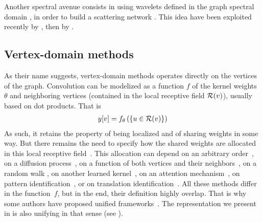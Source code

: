 Another spectral avenue consists in using wavelets defined in the graph spectral domain \citep{hammond2011wavelets}, in order to build a scattering network \citep{bruna2013invariant,chen2014unsupervised}. This idea have been exploited recently by \cite{zou2018Graph}, then by \cite{gama2018Diffusion}.

\subsection{Vertex-domain methods}
\label{sec:vert}

As their name suggests, vertex-domain methods operates directly on the vertices of the graph. %
Convolution can be modelized as a function $f$ of the kernel weights $\theta$ and neighboring vertices (contained in the local receptive field $\mathcal{R}(v)$), usually based on dot products. That is
\begin{gather}
y[v] = f_\theta\left(\{u \in \mathcal{R}(v)\}\right)
\end{gather}
As such, it retains the property of being localized and of sharing weights in some way. But there remains the need to specify how the shared weights are allocated in this local receptive field~\citep{vialatte2016generalizing}. This allocation can depend on \eg an arbitrary order~\citep{niepert2016learning}, on a diffusion process~\citep{atwood2016diffusion}, on a function of both vertices and their neighbors~\citep{monti2016geometric,simonovsky2017dynamic}, on a random walk \citep{hechtlinger2017generalization}, on another learned kernel~\citep{vialatte2017learning}, on an attention mechanism~\citep{velickovic2017graph,lee2018attention}, on pattern identification~\citep{sankar2017motif}, or on translation identification~\citep{pasdeloup2017convolutional}. All these methods differ in the function~$f$, but in the end, their definition highly overlap. That is why some authors have proposed unified frameworks~\citep{gilmer2017neural}. The representation we present in  is also unifying in that sense (see ).

